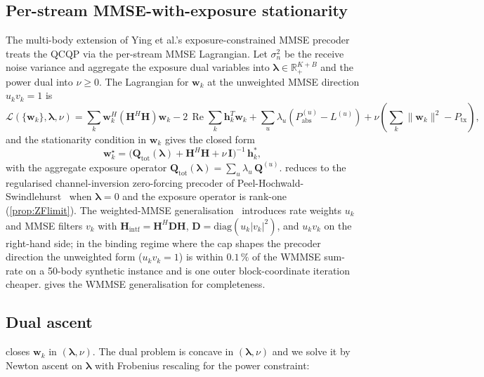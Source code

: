 \documentclass[journal,twocolumn,10pt]{IEEEtran}
\theoremstyle{plain}
\theoremstyle{remark}
\newcommand{\hh}{\mathbf{h}}
\newcommand{\ww}{\mathbf{w}}
\newcommand{\Pabs}{P_{\mathrm{abs}}}
\newcommand{\Qmat}{\mathbf{Q}}
\newcommand{\Hintf}{\mathbf{H}_{\mathrm{intf}}}
\DeclareMathOperator{\RE}{Re}
\begin{document}
\subsection{Per-stream MMSE-with-exposure stationarity}\label{sec:mmse-stationarity}

The multi-body extension of Ying et al.'s exposure-constrained
MMSE precoder~\cite{Ying2015,Ying2017} treats the QCQP via the
per-stream MMSE Lagrangian. Let $\sigma_n^2$ be the receive noise
variance and aggregate the exposure dual variables into
$\bm\lambda \in \mathbb{R}_+^{K+B}$ and the power dual into
$\nu \geq 0$. The Lagrangian for $\ww_k$ at the unweighted
MMSE direction $u_k v_k = 1$ is
\begin{equation}\label{eq:lagrangian-mmse}
  \mathcal{L}(\{\ww_k\}, \bm\lambda, \nu)
  = \sum_k \ww_k^H (\mathbf{H}^H \mathbf{H})\ww_k
  - 2\,\RE \sum_k \hh_k^T \ww_k
  + \sum_u \lambda_u (\Pabs^{(u)} - L^{(u)})
  + \nu (\textstyle\sum_k \|\ww_k\|^2 - P_{\mathrm{tx}}),
\end{equation}
and the stationarity condition in $\ww_k$ gives the closed form
\begin{equation}\label{eq:closedform}
  \boxed{\;
  \ww_k^\star =
  \bigl(\Qmat_{\mathrm{tot}}(\bm\lambda)
  + \mathbf{H}^H \mathbf{H} + \nu\,\mathbf{I}\bigr)^{-1}\,\hh_k^*,\;}
\end{equation}
with the aggregate exposure operator
$\Qmat_{\mathrm{tot}}(\bm\lambda) = \sum_{u} \lambda_u\,\Qmat^{(u)}$.
 reduces to the regularised channel-inversion
zero-forcing precoder of Peel-Hochwald-Swindlehurst~\cite{PeelHochwald2005}
when $\bm\lambda = 0$ and the exposure operator is rank-one
(\cref{prop:ZFlimit}). The weighted-MMSE
generalisation~\cite{Christensen2008,Shi2011} introduces rate
weights $u_k$ and MMSE filters $v_k$ with $\Hintf = \mathbf{H}^H
\mathbf{D} \mathbf{H}$, $\mathbf{D} = \mathrm{diag}(u_k|v_k|^2)$,
and $u_k v_k$ on the right-hand side; in the binding regime where
the cap shapes the precoder direction the unweighted form
($u_k v_k = 1$) is within $0.1\,\%$ of the WMMSE sum-rate on a 50-body
synthetic instance and is one outer block-coordinate iteration
cheaper.  gives the WMMSE generalisation for
completeness.

\subsection{Dual ascent}\label{sec:dual-ascent}

 closes $\ww_k$ in $(\bm\lambda, \nu)$. The dual
problem is concave in $(\bm\lambda, \nu)$ and we
solve it by Newton ascent on $\bm\lambda$ with Frobenius rescaling
for the power constraint:
\end{document}
